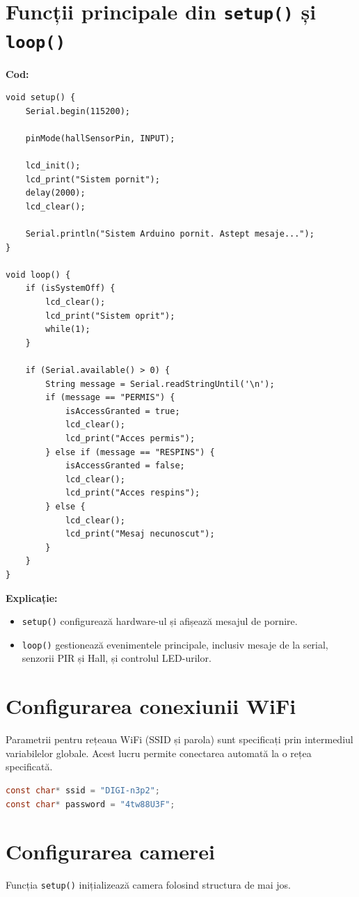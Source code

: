 \documentclass[a4paper,12pt]{report}
\begin{document}
\section{Funcții principale din \texttt{setup()} și \texttt{loop()}}
\textbf{Cod:}
\begin{lstlisting}
void setup() {
    Serial.begin(115200);

    pinMode(hallSensorPin, INPUT);

    lcd_init();
    lcd_print("Sistem pornit");
    delay(2000);
    lcd_clear();

    Serial.println("Sistem Arduino pornit. Astept mesaje...");
}

void loop() {
    if (isSystemOff) {
        lcd_clear();
        lcd_print("Sistem oprit");
        while(1);
    }

    if (Serial.available() > 0) {
        String message = Serial.readStringUntil('\n');
        if (message == "PERMIS") {
            isAccessGranted = true;
            lcd_clear();
            lcd_print("Acces permis");
        } else if (message == "RESPINS") {
            isAccessGranted = false;
            lcd_clear();
            lcd_print("Acces respins");
        } else {
            lcd_clear();
            lcd_print("Mesaj necunoscut");
        }
    }
}
\end{lstlisting}

\textbf{Explicație:}
\begin{itemize}
    \item \texttt{setup()} configurează hardware-ul și afișează mesajul de pornire.
    \item \texttt{loop()} gestionează evenimentele principale, inclusiv mesaje de la serial, senzorii PIR și Hall, și controlul LED-urilor.
\end{itemize}


\section{Configurarea conexiunii WiFi}
Parametrii pentru rețeaua WiFi (SSID și parola) sunt specificați prin intermediul variabilelor globale. Acest lucru permite conectarea automată la o rețea specificată.

\begin{lstlisting}[language=C, caption=Configurarea rețelei WiFi]
const char* ssid = "DIGI-n3p2";
const char* password = "4tw88U3F";
\end{lstlisting}

\section{Configurarea camerei}
Funcția \texttt{setup()} inițializează camera folosind structura de mai jos.
\end{document}

